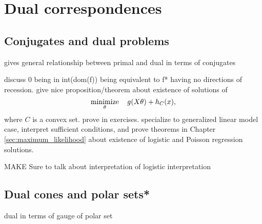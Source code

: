 \chapter{Dual correspondences}
\label{chap:dual_correspondences}

\section{Conjugates and dual problems}
\label{sec:conjugates_dual_problems}

gives general relationship between primal and dual in terms of conjugates

discuss 0 being in int(dom(f)) being equivalent to f* having no directions
of recession.  give nice proposition/theorem about existence of solutions of 
$$
\operatorname*{minimize}_\theta \quad g(X \theta) + h_C(x),
$$
where $C$ is a convex set. prove in exercises.  specialize to generalized linear
model case, interpret sufficient conditions, and prove theorems in Chapter
\ref{sec:maximum_likelihood} about existence of logistic and Poisson regression
solutions. 

MAKE Sure to talk about interpretation of logistic interpretation

\section{Dual cones and polar sets*}
\label{sec:dual_cones_polar_sets}

dual in terms of gauge of polar set

